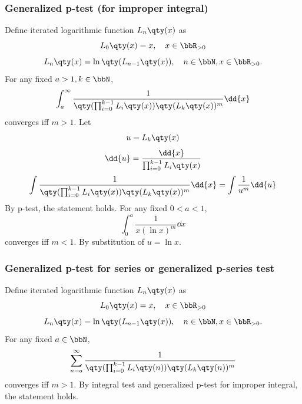 \documentclass[a4paper,12pt]{report}
\begin{document}
\begin{itemize}
\begin{itemize}
\subsubsection{Generalized p-test (for improper integral)}
Define iterated logarithmic function $L_n\qty(x)$ as
\[L_{0}\qty(x)=x,\quad x\in\bbR_{>0}\]
\[L_{n}\qty(x)=\ln\qty(L_{n-1}\qty(x)),\quad n\in\bbN,x\in\bbR_{>0}.\]
For any fixed $a>1,k\in\bbN$,
\[\int_a^{\infty}\frac{1}{\qty(\prod_{i=0}^{k-1}L_{i}\qty(x))\qty(L_{k}\qty(x))^m}\dd{x}\]
converges iff $m>1$.
\bpr
Let
\[u=L_k\qty(x)\]
\[\dd{u}=\frac{\dd{x}}{\prod_{i=0}^{k-1}L_{i}\qty(x)}\]
\[\int\frac{1}{\qty(\prod_{i=0}^{k-1}L_{i}\qty(x))\qty(L_{k}\qty(x))^m}\dd{x}=\int\frac{1}{u^m}\dd{u}\]
By p-test, the statement holds.
\epr
For any fixed $0<a<1$,
\[\int_0^a\frac{1}{x(\ln x)^m}\dd{x}\]
converges iff $m<1$.
\bpr
By substitution of $u=\ln x$.
\epr
\subsubsection{Generalized p-test for series or generalized p-series test}
Define iterated logarithmic function $L_n\qty(x)$ as
\[L_{0}\qty(x)=x,\quad x\in\bbR_{>0}\]
\[L_{n}\qty(x)=\ln\qty(L_{n-1}\qty(x)),\quad n\in\bbN,x\in\bbR_{>0}.\]
For any fixed $a\in\bbN$,
\[\sum_{n=a}^{\infty}\frac{1}{\qty(\prod_{i=0}^{k-1}L_{i}\qty(n))\qty(L_{k}\qty(n))^m}\]
converges iff $m>1$.
\bpr
By integral test and generalized p-test for improper integral, the statement holds.
\epr

\end{itemize}
\end{itemize}
\end{document}
